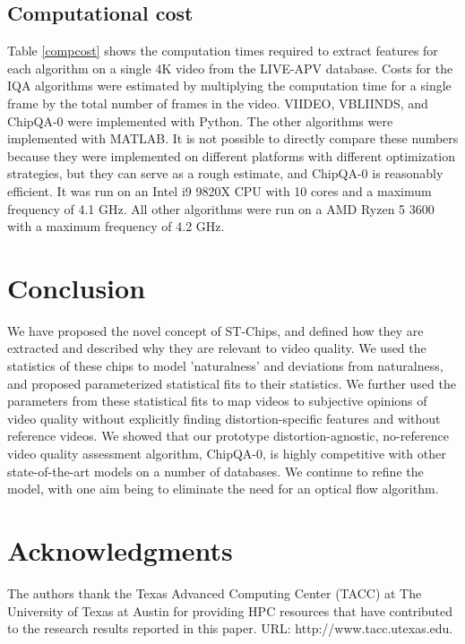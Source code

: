 \documentclass[conference]{IEEEtran}
\begin{document}
\color{black}
\subsection{Computational cost}
Table \ref{compcost} shows the computation times required to extract features for each algorithm on a single 4K video from the LIVE-APV database. Costs for the IQA algorithms were estimated by multiplying the computation time for a single frame by the total number of frames in the video. VIIDEO, VBLIINDS, and ChipQA-0 were implemented with Python. The other algorithms were implemented with MATLAB\textsuperscript{\textregistered}. It is not possible to directly compare these numbers because they were implemented on different platforms with different optimization strategies, but they can serve as a rough estimate, and ChipQA-0 is reasonably efficient. It was run on an Intel i9 9820X CPU with 10 cores and a maximum frequency of 4.1 GHz. All other algorithms were run on a AMD Ryzen 5 3600 with a maximum frequency of 4.2 GHz.

\color{black}
\section{Conclusion}
We have proposed the novel concept of ST-Chips, and defined how they are extracted and described why they are relevant to video quality. We used the statistics of these chips to model 'naturalness' and deviations from naturalness, and proposed parameterized statistical fits to their statistics. We further used the parameters from these statistical fits to map videos to subjective opinions of video quality without explicitly finding distortion-specific features and without reference videos. We showed that our prototype distortion-agnostic, no-reference video quality assessment algorithm, ChipQA-0, is highly competitive with other state-of-the-art models on a number of databases. We continue to refine the model, with one aim being to eliminate the need for an optical flow algorithm.

\section{Acknowledgments}

The authors thank the Texas Advanced Computing Center (TACC) at The University of Texas at Austin for providing HPC resources that have contributed to the research results reported in this paper. URL: http://www.tacc.utexas.edu.





\end{document}
